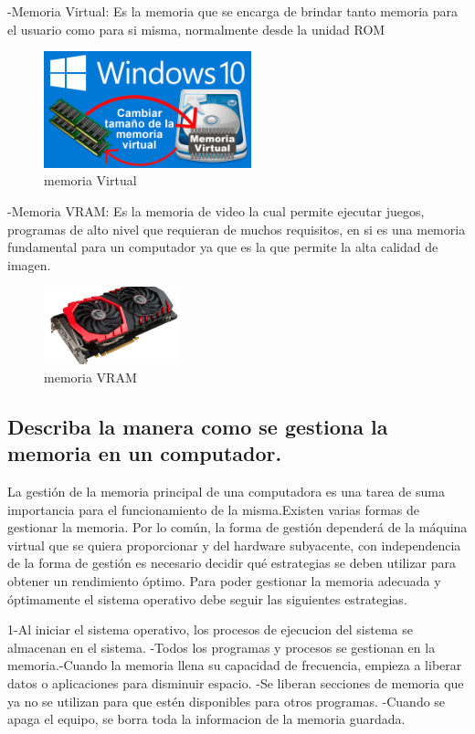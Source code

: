 \documentclass{article}
\begin{document}
-Memoria Virtual: Es la memoria que se encarga de brindar tanto memoria para el usuario como para si misma, normalmente desde la unidad ROM \newline
\begin{figure}[h]
\includegraphics[width=6cm]{Virtual.png}
\centering
\caption{memoria Virtual}
\end{figure}

-Memoria VRAM: Es la memoria de video la cual permite ejecutar juegos, programas de alto nivel que requieran de muchos requisitos, en si es una memoria fundamental para un computador ya que es la que permite la alta calidad de imagen. \newline
\begin{figure}[h]
\includegraphics[width=4cm]{Vram.jpg}
\centering
\caption{memoria VRAM}
\end{figure}

\subsection{Describa la manera como se gestiona la memoria en un computador.}

La gestión de la memoria principal de una computadora es una tarea de suma importancia para el funcionamiento de la misma.Existen varias formas de gestionar la memoria. Por lo común, la forma de gestión dependerá de la máquina virtual que se quiera proporcionar y del hardware subyacente, con independencia de la forma de gestión es necesario decidir qué estrategias se deben utilizar para obtener un rendimiento óptimo. Para poder gestionar la memoria adecuada y óptimamente el sistema operativo debe seguir las siguientes estrategias. \newline

1-Al iniciar el sistema operativo, los procesos de ejecucion del sistema se almacenan en el sistema. -Todos los programas y procesos se gestionan en la memoria.-Cuando la memoria llena su capacidad de frecuencia, empieza a liberar datos o aplicaciones para disminuir espacio. -Se liberan secciones de memoria que ya no se utilizan para que estén disponibles para otros programas. -Cuando se apaga el equipo, se borra toda la informacion de la memoria guardada.\newline
\end{document}
